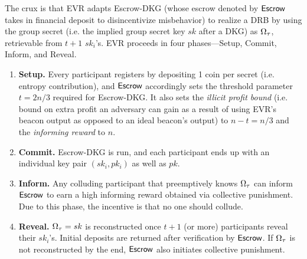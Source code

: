 
The crux is that EVR adapts Escrow-DKG (whose escrow denoted by $\mathsf{Escrow}$ takes in financial deposit to disincentivize misbehavior) to realize a DRB by using the group secret (i.e. the implied group secret key $sk$ after a DKG) as $\Omega_\tau$, retrievable from $t + 1$ $sk_i$'s. EVR proceeds in four phases---Setup, Commit, Inform, and Reveal.
\begin{enumerate}
    \item \textbf{Setup.} Every participant registers by depositing 1 coin per secret (i.e. entropy contribution), and $\mathsf{Escrow}$ accordingly sets the threshold parameter $t = 2n / 3$ required for Escrow-DKG. It also sets the \textit{illicit profit bound} (i.e. bound on extra profit an adversary can gain as a result of using EVR's beacon output as opposed to an ideal beacon's output) to $n - t = n / 3$ and the \textit{informing reward} to $n$.
    \item \textbf{Commit.} Escrow-DKG is run, and each participant ends up with an individual key pair $(sk_i, pk_i)$ as well as $pk$.
    \item \textbf{Inform.} Any colluding participant that preemptively knows $\Omega_\tau$ can inform $\mathsf{Escrow}$ to earn a high informing reward obtained via collective punishment. Due to this phase, the incentive is that no one should collude.
    \item \textbf{Reveal.} $\Omega_\tau = sk$ is reconstructed once $t + 1$ (or more) participants reveal their $sk_i$'s. Initial deposits are returned after verification by $\mathsf{Escrow}$. If $\Omega_\tau$ is not reconstructed by the end, $\mathsf{Escrow}$ also initiates collective punishment.
\end{enumerate}

